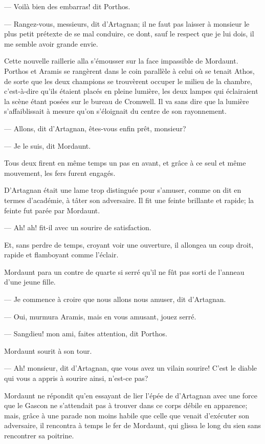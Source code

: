 — Voilà bien des embarras! dit Porthos.

— Rangez-vous, messieurs, dit d'Artagnan; il ne faut pas laisser à monsieur le plus petit prétexte de se mal conduire, ce dont, sauf le respect que je lui dois, il me semble avoir grande envie.

Cette nouvelle raillerie alla s'émousser sur la face impassible de Mordaunt.
Porthos et Aramis se rangèrent dans le coin parallèle à celui où se tenait Athos, de sorte que les deux champions se trouvèrent occuper le milieu de la chambre, c'est-à-dire qu'ils étaient placés en pleine lumière, les deux lampes qui éclairaient la scène étant posées sur le bureau de Cromwell. Il va sans dire que la lumière s'affaiblissait à mesure qu'on s'éloignait du centre de son rayonnement.

— Allons, dit d'Artagnan, êtes-vous enfin prêt, monsieur?

— Je le suis, dit Mordaunt.

Tous deux firent en même temps un pas en avant, et grâce à ce seul et même mouvement, les fers furent engagés.

D'Artagnan était une lame trop distinguée pour s'amuser, comme on dit en termes d'académie, à tâter son adversaire. Il fit une feinte brillante et rapide; la feinte fut parée par Mordaunt.

— Ah! ah! fit-il avec un sourire de satisfaction.

Et, sans perdre de temps, croyant voir une ouverture, il allongea un coup droit, rapide et flamboyant comme l'éclair.

Mordaunt para un contre de quarte si serré qu'il ne fût pas sorti de l'anneau d'une jeune fille.

— Je commence à croire que nous allons nous amuser, dit d'Artagnan.

— Oui, murmura Aramis, mais en vous amusant, jouez serré.

— Sangdieu! mon ami, faites attention, dit Porthos.

Mordaunt sourit à son tour.

— Ah! monsieur, dit d'Artagnan, que vous avez un vilain sourire! C'est le diable qui vous a appris à sourire ainsi, n'est-ce pas?



Mordaunt ne répondit qu'en essayant de lier l'épée de d'Artagnan avec une force que le Gascon ne s'attendait pas à trouver dans ce corps débile en apparence; mais, grâce à une parade non moins habile que celle que venait d'exécuter son adversaire, il rencontra à temps le fer de Mordaunt, qui glissa le long du sien sans rencontrer sa poitrine.

